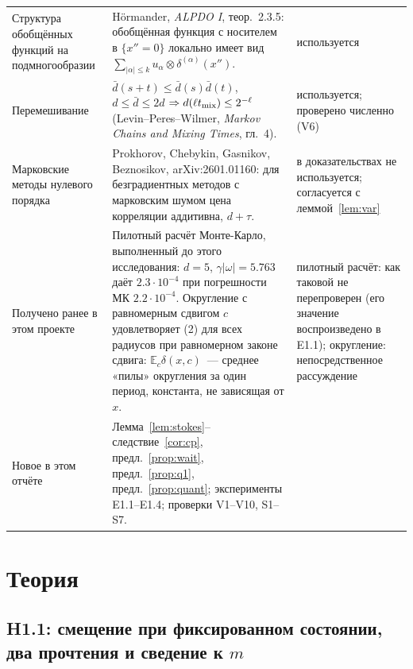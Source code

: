 \documentclass[11pt,a4paper]{article}
\numberwithin{equation}{section}
\theoremstyle{definition}
\theoremstyle{remark}
\newcommand{\E}{\mathbb E}\newcommand{\R}{\mathbb R}\newcommand{\N}{\mathbb N}\let\Prob\relax\newcommand{\Prob}{\mathbb P}
\begin{document}
{\begin{xltabular}{\textwidth}{@{}p{3.3cm}Xp{2.6cm}@{}}
Структура обобщённых функций на подмногообразии & Hörmander, \emph{ALPDO I}, теор.~2.3.5: обобщённая функция с носителем в $\{x''=0\}$ локально имеет вид $\sum_{|\alpha|\le k}u_\alpha\otimes\delta^{(\alpha)}(x'')$. & используется \\
Перемешивание & $\bar d(s+t)\le\bar d(s)\bar d(t)$, $d\le\bar d\le2d$ $\Rightarrow d(\ell t_{\rm mix})\le2^{-\ell}$ (Levin--Peres--Wilmer, \emph{Markov Chains and Mixing Times}, гл.~4). & используется; проверено численно (V6) \\
Марковские методы нулевого порядка & Prokhorov, Chebykin, Gasnikov, Beznosikov, arXiv:2601.01160: для безградиентных методов с марковским шумом цена корреляции аддитивна, $d+\tau$. & в доказательствах не используется; согласуется с леммой~\ref{lem:var} \\
\midrule
Получено ранее в этом проекте & Пилотный расчёт Монте-Карло, выполненный до этого исследования: $d=5$, $\gamma|\omega|=5.763$ даёт $2.3\cdot10^{-4}$ при погрешности МК $2.2\cdot10^{-4}$. Округление с равномерным сдвигом $c$ удовлетворяет (2) для всех радиусов при равномерном законе сдвига: $\E_c\delta(x,c)$~--- среднее «пилы» округления за один период, константа, не зависящая от $x$. & пилотный расчёт: как таковой не перепроверен (его значение воспроизведено в E1.1); округление: непосредственное рассуждение \\
\midrule
Новое в этом отчёте & Лемма~\ref{lem:stokes}--следствие~\ref{cor:cp}, предл.~\ref{prop:wait}, предл.~\ref{prop:q1}, предл.~\ref{prop:quant}; эксперименты E1.1--E1.4; проверки V1--V10, S1--S7. & \\
\bottomrule
\end{xltabular}}

\section{Теория}\label{sec:theory}
\subsection{H1.1: смещение при фиксированном состоянии, два прочтения и сведение к $m$}
\end{document}
